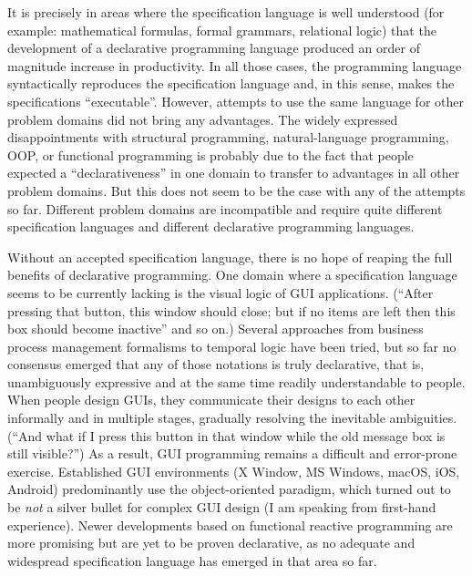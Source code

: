 It is precisely in areas where the specification language is well
understood (for example: mathematical formulas, formal grammars, relational
logic) that the development of a declarative programming language
produced an order of magnitude increase in productivity. In all those
cases, the programming language syntactically reproduces the specification
language and, in this sense, makes the specifications \textsf{``}executable\textsf{''}.
However, attempts to use the same language for other problem domains
did not bring any advantages. The widely expressed disappointments
with structural programming, natural-language programming, OOP, or
functional programming is probably due to the fact that people expected
a \textsf{``}declarativeness\textsf{''} in one domain to transfer to advantages in
all other problem domains. But this does not seem to be the case with
any of the attempts so far. Different problem domains are incompatible
and require quite different specification languages and different
declarative programming languages.

Without an accepted specification language, there is no hope of reaping
the full benefits of declarative programming. One domain where a specification
language seems to be currently lacking is the visual logic of GUI
applications. (\textsf{``}After pressing that button, this window should close;
but if no items are left then this box should become inactive\textsf{''} and
so on.) Several approaches \textemdash{} from business process management
formalisms to temporal logic \textemdash{} have been tried, but so
far no consensus emerged that any of those notations is truly declarative,
\textemdash{} that is, unambiguously expressive and at the same time
readily understandable to people. When people design GUIs, they communicate
their designs to each other informally and in multiple stages, gradually
resolving the inevitable ambiguities. (\textsf{``}And what if I press this
button in that window while the old message box is still visible?\textsf{''})
As a result, GUI programming remains a difficult and error-prone exercise.
Established GUI environments (X Window, MS Windows, macOS, iOS, Android)
predominantly use the object-oriented paradigm, which turned out to
be \emph{not} a silver bullet for complex GUI design (I am speaking
from first-hand experience). Newer developments based on functional
reactive programming are more promising but are yet to be proven declarative,
as no adequate and widespread specification language has emerged in
that area so far. 

